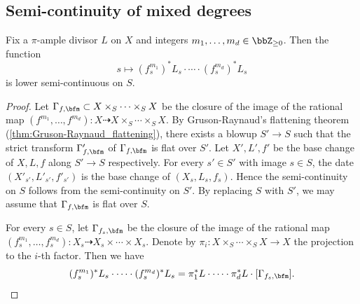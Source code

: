 \subsection{Semi-continuity of mixed degrees}

\begin{proposition}\label{prop:semi-continuity-mixed-degrees}
	Fix a $\pi$-ample divisor $L$ on $X$ and integers $m_1, \ldots, m_d \in \bbZ_{\geq 0}$.
	Then the function
	\[ s \mapsto (f_s^{m_1})^*L_s \cdot \cdots \cdot (f_s^{m_d})^*L_s \]
	is lower semi-continuous on $S$.
\end{proposition}
\begin{proof}
	Let $\Gamma_{f,\bfm} \subset X \times_S \cdots \times_S X$ be the closure of the image of the rational map $(f^{m_1}, \ldots, f^{m_d}): X \dashrightarrow X \times_S \cdots \times_S X$.
	By Gruson-Raynaud's flattening theorem (\cref{thm:Gruson-Raynaud_flattening}), there exists a blowup $S' \to S$ such that the strict transform $\Gamma'_{f,\bfm}$ of $\Gamma_{f,\bfm}$ is flat over $S'$.
	Let $X', L', f'$ be the base change of $X, L, f$ along $S' \to S$ respectively.
	For every $s' \in S'$ with image $s \in S$, the date $(X'_{s'}, L'_{s'}, f'_{s'})$ is the base change of $(X_s, L_s, f_s)$.
	Hence the semi-continuity on $S$ follows from the semi-continuity on $S'$.
	By replacing $S$ with $S'$, we may assume that $\Gamma_{f,\bfm}$ is flat over $S$.

	For every $s \in S$, let $\Gamma_{f_s,\bfm}$ be the closure of the image of the rational map $(f_s^{m_1}, \ldots, f_s^{m_d}): X_s \dashrightarrow X_s \times \cdots \times X_s$.
	Denote by $\pi_i: X \times_S \cdots \times_S X \to X$ the projection to the $i$-th factor.
	Then we have
	\[ (f_s^{m_1})^*L_s \cdot \cdots \cdot (f_s^{m_d})^*L_s = \pi_1^*L \cdot \cdots \cdot \pi_d^*L \cdot [\Gamma_{f_s,\bfm}]. \]


\end{proof}
